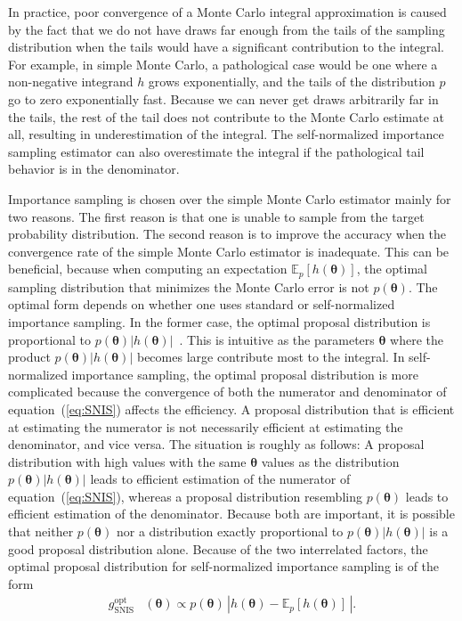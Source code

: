 \documentclass[12pt]{article}
\newenvironment{nalign}{
    \begin{equation}
    \begin{aligned}
}{
    \end{aligned}
    \end{equation}
    \ignorespacesafterend
}
\begin{document}
In practice, poor convergence of a Monte Carlo integral approximation is caused by the fact that
we do not have draws far enough from the tails of the sampling distribution when
the tails would have a significant contribution to the integral.
For example, in simple Monte Carlo, a pathological
case would be one where a non-negative integrand $h$ grows exponentially,
and the tails of the distribution $p$ go to zero exponentially fast.
Because we can never get draws arbitrarily far in the tails,
the rest of the tail
does not contribute to the Monte Carlo estimate at all, resulting in
underestimation of the integral.
The self-normalized importance sampling estimator
can also overestimate the integral if the pathological
tail behavior is in the denominator.


Importance sampling is chosen over the simple Monte Carlo estimator mainly for two reasons.
The first reason is that one is unable to
sample from the target probability distribution.
The second reason is to improve the accuracy when
the convergence rate of the simple Monte Carlo estimator is inadequate.
This can be beneficial, because when computing an expectation
$\mathbb{E}_p [h(\boldsymbol{\theta})]$, the optimal
sampling distribution that minimizes the Monte Carlo error is not $p (\boldsymbol{\theta})$.
The optimal form depends on whether one uses standard or self-normalized importance sampling.
In the former case, the optimal proposal distribution is proportional to
$p (\boldsymbol{\theta}) |h(\boldsymbol{\theta})|$~\citep{kahn1953methods}.
%
%
%
%
%
This is intuitive as the parameters $\boldsymbol{\theta}$ where the product 
$p (\boldsymbol{\theta}) |h(\boldsymbol{\theta})|$
becomes large contribute most to the integral.
%
%
%
%
%
%
In self-normalized importance sampling, the optimal proposal
distribution is more complicated
because the convergence of both the numerator and denominator of equation~(\ref{eq:SNIS})
affects the efficiency.
%
A proposal distribution that is efficient at estimating the numerator 
is not necessarily efficient at estimating the denominator, and
vice versa.
The situation is roughly as follows:
A proposal distribution with high values with the same $\boldsymbol{\theta}$ values as the distribution $p (\boldsymbol{\theta}) | h(\boldsymbol{\theta}) | $ leads to efficient estimation of the numerator of equation~(\ref{eq:SNIS}), whereas
a proposal distribution resembling
$ p (\boldsymbol{\theta})$ leads to efficient estimation of the denominator.
Because both are important, it is possible that neither $p (\boldsymbol{\theta})$ nor a distribution exactly proportional to $p (\boldsymbol{\theta}) | h(\boldsymbol{\theta}) |$ is
a good proposal distribution alone.
Because of the two interrelated factors,
the optimal proposal distribution for self-normalized importance sampling is of the form~\citep{hesterberg1988advances}
\begin{nalign} \label{eq:snisopt}
g_{\text{SNIS}}^{\text{opt}} & (\boldsymbol{\theta})  \propto p (\boldsymbol{\theta}) \, |h(\boldsymbol{\theta}) - \mathbb{E}_p [h(\boldsymbol{\theta})]\, | .
%
%
%
%
%
%
\end{nalign}
\end{document}
